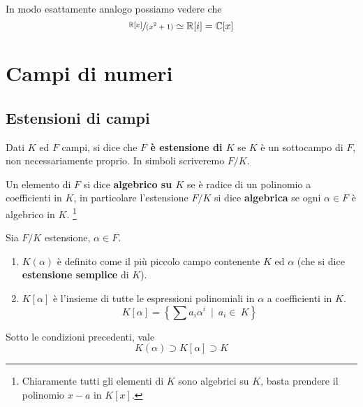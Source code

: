 \begin{esempio}
	In modo esattamente analogo possiamo vedere che 
	\begin{equation*}
	\sfrac{\mathbb{R}[x]}{(x^2+1)}\simeq\mathbb{R}[i]=\mathbb{C}[x]
	\end{equation*}
\end{esempio}




\section{Campi di numeri}
\subsection{Estensioni di campi}
\label{lezione15}
\begin{definizione}
	Dati $K$ ed $F$ campi, si dice che \textbf{$F$ è estensione di $K$} se $K$ è un sottocampo di $F$, non necessariamente proprio. In simboli scriveremo $F/K$.
\end{definizione}
\begin{definizione}
	Un elemento di $F$ si dice \textbf{algebrico su $K$} se è radice di un polinomio a coefficienti in $K$, in particolare l'estensione $F/K$ si dice \textbf{algebrica} se ogni $\alpha\in F$ è algebrico in $K$. \footnote{Chiaramente tutti gli elementi di $K$ sono algebrici su $K$, basta prendere il polinomio $x-a$ in $K[x]$.}
\end{definizione}
\begin{definizione}
	Sia $F/K$ estensione, $\alpha\in F$.
	\begin{enumerate}
		\item $K(\alpha)$ è definito come il più piccolo campo contenente $K$ ed $\alpha$ (che si dice \textbf{estensione semplice} di $K$).
		\item $K[\alpha]$ è l'insieme di tutte le espressioni polinomiali in $\alpha$ a coefficienti in $K$.
		\begin{equation*}
		K[\alpha]=\left\{\sum a_i\alpha^i \ \mid \ a_i\in\ K\right\}
		\end{equation*}
	\end{enumerate}
\end{definizione}
\begin{proposizione} 
	Sotto le condizioni precedenti, vale
	\begin{equation*}
	K(\alpha)\supset K[\alpha] \supset K
	\end{equation*}
\end{proposizione}
